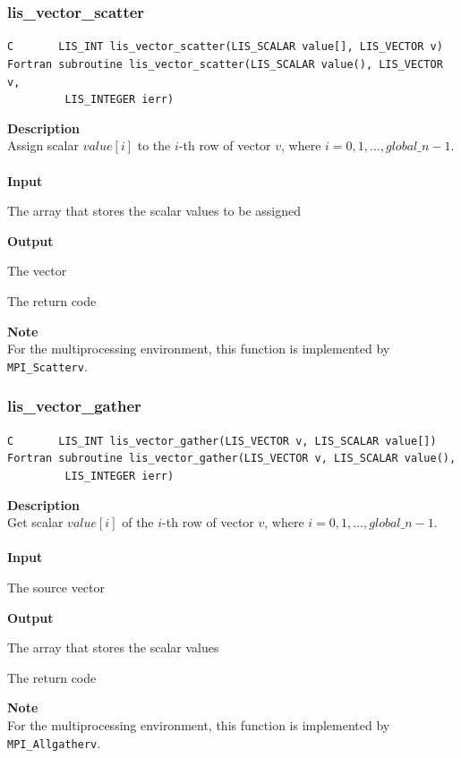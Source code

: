 \documentclass[a4paper]{article}
\newcommand{\namelistlabel}[1]{\mbox{#1}\hfill}
\newenvironment{namelist}[1]{%
\begin{list}{}
  {\let\makelabel\namelistlabel
  \settowidth{\labelwidth}{#1}
  \setlength{\leftmargin}{1.1\labelwidth}}
  }{%
\end{list}}
\begin{document}
\subsubsection{lis\_vector\_scatter}
\begin{screen}
\verb|C       LIS_INT lis_vector_scatter(LIS_SCALAR value[], LIS_VECTOR v)|\\
\verb|Fortran subroutine lis_vector_scatter(LIS_SCALAR value(), LIS_VECTOR v,|\\
\verb|         LIS_INTEGER ierr)|
\end{screen}
{\bf Description}\\
\indent
Assign scalar $value[i]$ to the $i$-th row of vector $v$, 
where $i=0,1,..., global\_n-1$.
\\ \\
\noindent
{\bf Input}
\begin{namelist}{XXXXXXXXXXXXXXXXXXXX}
\item[\tt value] The array that stores the scalar values to be assigned
\end{namelist}
{\bf Output}
\begin{namelist}{XXXXXXXXXXXXXXXXXXXX}
\item[\tt v] The vector
\item[\tt ierr] The return code
\end{namelist}
{\bf Note}\\
\indent
For the multiprocessing environment, this function is implemented by \verb|MPI_Scatterv|.

\newpage
\subsubsection{lis\_vector\_gather}
\begin{screen}
\verb|C       LIS_INT lis_vector_gather(LIS_VECTOR v, LIS_SCALAR value[])|\\
\verb|Fortran subroutine lis_vector_gather(LIS_VECTOR v, LIS_SCALAR value(),|\\
\verb|         LIS_INTEGER ierr)|
\end{screen}
{\bf Description}\\
\indent
Get scalar $value[i]$ of the $i$-th row of vector $v$, 
where $i=0,1,..., global\_n-1$.
\\ \\
\noindent
{\bf Input}
\begin{namelist}{XXXXXXXXXXXXXXXXXXXX}
\item[\tt v] The source vector
\end{namelist}
{\bf Output}
\begin{namelist}{XXXXXXXXXXXXXXXXXXXX}
\item[\tt value] The array that stores the scalar values
\item[\tt ierr] The return code
\end{namelist}
{\bf Note}\\
\indent
For the multiprocessing environment, this function is implemented by \verb|MPI_Allgatherv|.
\end{document}
